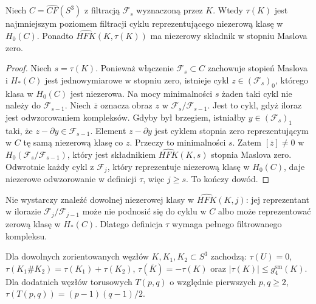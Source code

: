 \begin{stwierdzenie}
\label{prop:kt-tau-cycle}
Niech $C=\widehat{CF}(S^3)$ z filtracją
$\mathcal F_s$ wyznaczoną przez $K$.
Wtedy $\tau(K)$ jest najmniejszym poziomem filtracji
cyklu reprezentującego niezerową klasę w $H_0(C)$.
Ponadto $\widehat{HFK}(K,\tau(K))$ ma niezerowy
składnik w stopniu Maslova zero.
\end{stwierdzenie}

\begin{proof}
Niech $s=\tau(K)$. Ponieważ włączenie
$\mathcal F_s\subset C$ zachowuje stopień Maslova
i $H_*(C)$ jest jednowymiarowe w stopniu zero,
istnieje cykl $z\in(\mathcal F_s)_0$,
którego klasa w $H_0(C)$ jest niezerowa.
Na mocy minimalności $s$ żaden taki cykl
nie należy do $\mathcal F_{s-1}$.
Niech $\overline z$ oznacza obraz $z$ w
$\mathcal F_s/\mathcal F_{s-1}$.
Jest to cykl, gdyż iloraz jest odwzorowaniem
kompleksów. Gdyby był brzegiem, istniałby
$y\in(\mathcal F_s)_1$ taki, że
$z-\partial y\in\mathcal F_{s-1}$.
Element $z-\partial y$ jest cyklem stopnia zero
reprezentującym w $C$ tę samą niezerową klasę co $z$.
Przeczy to minimalności $s$.
Zatem $[\overline z]\ne0$ w
$H_0(\mathcal F_s/\mathcal F_{s-1})$, który
jest składnikiem $\widehat{HFK}(K,s)$
stopnia Maslova zero.
Odwrotnie każdy cykl z $\mathcal F_j$,
który reprezentuje niezerową klasę w $H_0(C)$,
daje niezerowe odwzorowanie w definicji $\tau$,
więc $j\geq s$. To kończy dowód.
\end{proof}

\begin{uwaga}
Nie wystarczy znaleźć dowolnej niezerowej klasy
w $\widehat{HFK}(K,j)$: jej reprezentant w
ilorazie $\mathcal F_j/\mathcal F_{j-1}$ może nie
podnosić się do cyklu w $C$ albo może reprezentować
zerową klasę w $H_*(C)$. Dlatego definicja $\tau$
wymaga pełnego filtrowanego kompleksu.
\end{uwaga}

\begin{twierdzenie}
Dla dowolnych zorientowanych węzłów $K,K_1,K_2\subset S^3$
zachodzą:
$\tau(U)=0$,
$\tau(K_1\#K_2)=\tau(K_1)+\tau(K_2)$,
$\tau(\overline K)=-\tau(K)$ oraz
$|\tau(K)|\leq g_4^{\mathrm{sm}}(K)$.
Dla dodatnich węzłów torusowych $T(p,q)$
o względnie pierwszych $p,q\geq2$,
$\tau(T(p,q))=(p-1)(q-1)/2$.
\end{twierdzenie}

